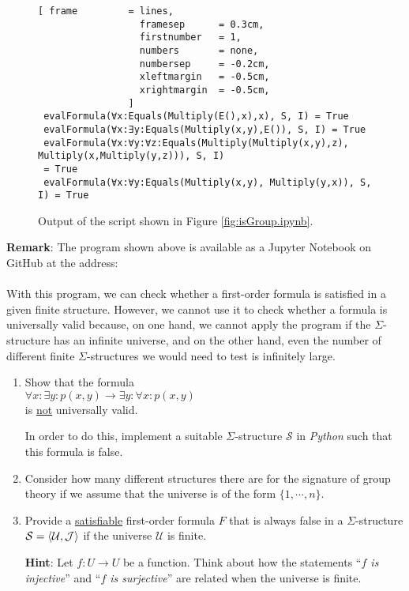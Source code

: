 \begin{figure}[!ht]
\centering
\begin{Verbatim}[ frame         = lines, 
                  framesep      = 0.3cm, 
                  firstnumber   = 1,
                  numbers       = none,
                  numbersep     = -0.2cm,
                  xleftmargin   = -0.5cm,
                  xrightmargin  = -0.5cm,
                ]
 evalFormula(∀x:Equals(Multiply(E(),x),x), S, I) = True
 evalFormula(∀x:∃y:Equals(Multiply(x,y),E()), S, I) = True
 evalFormula(∀x:∀y:∀z:Equals(Multiply(Multiply(x,y),z), Multiply(x,Multiply(y,z))), S, I)
 = True
 evalFormula(∀x:∀y:Equals(Multiply(x,y), Multiply(y,x)), S, I) = True
\end{Verbatim}
\vspace*{-0.3cm}
\caption{Output of the script shown in Figure \ref{fig:isGroup.ipynb}.}
\label{fig:isGroup.out}
\end{figure}
\noindent
\textbf{Remark}: The program shown above is available as a Jupyter Notebook on GitHub at the address:
\\[0.2cm]
\hspace*{-1.0cm}
\href{https://github.com/karlstroetmann/Logic/blob/master/Python/Chapter-5/01-FOL-Evaluation.ipynb}{}
\\[0.2cm]
With this program, we can check whether a
first-order formula is satisfied in a given finite structure. However, we cannot use it to check whether a
formula is universally valid because, on one hand, we cannot apply the program if the $\Sigma$-structure has an
infinite universe, and on the other hand, even the number of different finite $\Sigma$-structures we would need
to test is infinitely large. \eox 

\exerciseEng
\begin{enumerate}
\item Show that the formula
      \\[0.2cm]
      \hspace*{1.3cm}
      $\forall x: \exists y: p(x,y) \rightarrow \exists y: \forall x: p(x,y)$
      \\[0.2cm]
      is \underline{not} universally valid.

      In order to do this, implement a suitable $\Sigma$-structure $\mathcal{S}$ in \textsl{Python}
      such that this formula is false. 

\item Consider how many different structures there are for the signature of group theory if we assume that the
      universe is of the form $\{1, \cdots, n\}$.

\item Provide a \underline{satisfiable} first-order formula $F$ that is always false in a 
      $\Sigma$-structure $\mathcal{S} = \pair(\mathcal{U},\mathcal{J})$ if  the universe $\mathcal{U}$ is finite.

      \textbf{Hint}: Let $f: U \rightarrow U$ be a function. Think about how the statements
      ``\emph{$f$ is injective}'' and ``\emph{$f$ is surjective}'' are related when the universe is finite.
      \exend  
\end{enumerate}

